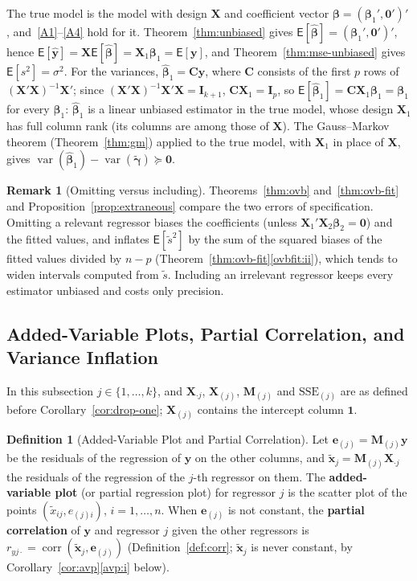 \documentclass[12pt,a4paper]{article}
\makeatletter
\theoremstyle{definition}
\newtheorem{definition}[theorem]{Definition}
\newtheorem{remark}[theorem]{Remark}
\renewenvironment{proof}[1][\proofname]{\par
  \pushQED{\qed}%
  \normalfont \topsep6\p@\@plus6\p@\relax
  \trivlist
  \item[\hskip\labelsep\bfseries #1\@addpunct{.}]\ignorespaces
}{%
  \popQED\endtrivlist\@endpefalse
}
\newcommand\expc{\mathsf{E}}
\DeclareMathOperator\var{var}
\DeclareMathOperator\corr{corr}
\newcommand{\SSE}{\mathrm{SSE}}
\newcommand{\bX}{\mathbf{X}}
\newcommand{\by}{\mathbf{y}}
\newcommand{\bx}{\mathbf{x}}
\def\bb{\boldsymbol{\beta}}
\newcommand{\bI}{\mathbf{I}}
\newcommand{\bM}{\mathbf{M}}
\newcommand{\bone}{\mathbf{1}}
\newcommand{\bzero}{\mathbf{0}}
\newcommand{\bC}{\mathbf{C}}
\makeatother
\begin{document}
\begin{proof}
The true model is the model with design $\bX$ and coefficient vector $\bb = (\bb_1', \bzero')'$, and~\ref{A1}--\ref{A4} hold for it. Theorem~\ref{thm:unbiased} gives $\expc[\hat{\bb}] = (\bb_1', \bzero')'$, hence $\expc[\hat{\by}] = \bX\expc[\hat{\bb}] = \bX_1\bb_1 = \expc[\by]$, and Theorem~\ref{thm:mse-unbiased} gives $\expc[s^2] = \sigma^2$. For the variances, $\hat{\bb}_1 = \bC\by$, where $\bC$ consists of the first $p$ rows of $(\bX'\bX)^{-1}\bX'$; since $(\bX'\bX)^{-1}\bX'\bX = \bI_{k+1}$, $\bC\bX_1 = \bI_p$, so $\expc[\hat{\bb}_1] = \bC\bX_1\bb_1 = \bb_1$ for every $\bb_1$: $\hat{\bb}_1$ is a linear unbiased estimator in the true model, whose design $\bX_1$ has full column rank (its columns are among those of $\bX$). The Gauss--Markov theorem (Theorem~\ref{thm:gm}) applied to the true model, with $\bX_1$ in place of $\bX$, gives $\var(\hat{\bb}_1) - \var(\tilde{\boldsymbol\gamma}) \succeq \bzero$.
\end{proof}

\begin{remark}[Omitting versus including]\label{rem:omit-include}
Theorems~\ref{thm:ovb} and~\ref{thm:ovb-fit} and Proposition~\ref{prop:extraneous} compare the two errors of specification. Omitting a relevant regressor biases the coefficients (unless $\bX_1'\bX_2\bb_2 = \bzero$) and the fitted values, and inflates $\expc[\tilde s^2]$ by the sum of the squared biases of the fitted values divided by $n - p$ (Theorem~\ref{thm:ovb-fit}\ref{ovbfit:ii}), which tends to widen intervals computed from $\tilde s$. Including an irrelevant regressor keeps every estimator unbiased and costs only precision.
\end{remark}

\subsection{Added-Variable Plots, Partial Correlation, and Variance Inflation}

In this subsection $j \in \{1, \ldots, k\}$, and $\bX_{\cdot j}$, $\bX_{(j)}$, $\bM_{(j)}$ and $\SSE_{(j)}$ are as defined before Corollary~\ref{cor:drop-one}; $\bX_{(j)}$ contains the intercept column $\bone$.

\begin{definition}[Added-Variable Plot and Partial Correlation]\label{def:avp}
Let $\mathbf{e}_{(j)} = \bM_{(j)}\by$ be the residuals of the regression of $\by$ on the other columns, and $\tilde{\bx}_j = \bM_{(j)}\bX_{\cdot j}$ the residuals of the regression of the $j$-th regressor on them. The \textbf{added-variable plot} (or partial regression plot) for regressor $j$ is the scatter plot of the points $(\tilde x_{ij}, e_{(j)i})$, $i = 1, \ldots, n$. When $\mathbf{e}_{(j)}$ is not constant, the \textbf{partial correlation} of $\by$ and regressor $j$ given the other regressors is $r_{yj\cdot} = \corr(\tilde{\bx}_j, \mathbf{e}_{(j)})$ (Definition~\ref{def:corr}; $\tilde{\bx}_j$ is never constant, by Corollary~\ref{cor:avp}\ref{avp:i} below).
\end{definition}
\end{document}

